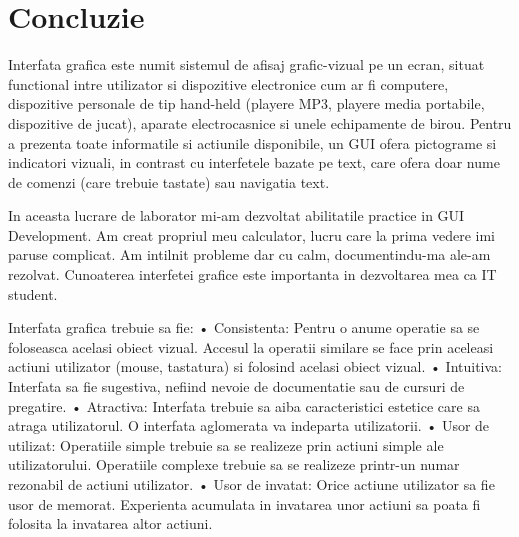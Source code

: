 
\section*{Concluzie}


Interfata grafica este numit sistemul de afisaj grafic-vizual pe un ecran, situat functional intre utilizator si dispozitive electronice cum ar fi computere, dispozitive personale de tip hand-held (playere MP3, playere media portabile, dispozitive de jucat), aparate electrocasnice si unele echipamente de birou. Pentru a prezenta toate informatile si actiunile disponibile, un GUI ofera pictograme si indicatori vizuali, in contrast cu interfetele bazate pe text, care ofera doar nume de comenzi (care trebuie tastate) sau navigatia text.

In aceasta lucrare de laborator mi-am dezvoltat abilitatile practice in GUI Development. Am creat propriul meu calculator, lucru care la prima vedere imi paruse complicat. Am intilnit probleme dar cu calm, documentindu-ma ale-am rezolvat. Cunoaterea interfetei grafice este importanta in dezvoltarea mea ca IT student. 


Interfata grafica trebuie sa fie:
• Consistenta: Pentru o anume operatie sa se foloseasca acelasi obiect vizual. Accesul la operatii similare se face prin aceleasi actiuni utilizator (mouse, tastatura) si folosind acelasi obiect vizual.
• Intuitiva: Interfata sa fie sugestiva, nefiind nevoie de documentatie sau de cursuri de pregatire.
• Atractiva: Interfata trebuie sa aiba caracteristici estetice care sa atraga utilizatorul. O interfata aglomerata va indeparta utilizatorii.
• Usor de utilizat: Operatiile simple trebuie sa se realizeze prin actiuni simple ale utilizatorului. Operatiile complexe trebuie sa se realizeze printr-un numar rezonabil de actiuni
utilizator.
• Usor de invatat: Orice actiune utilizator sa fie usor de memorat. Experienta acumulata in invatarea unor actiuni sa poata fi folosita la invatarea altor actiuni.  

\clearpage

      
